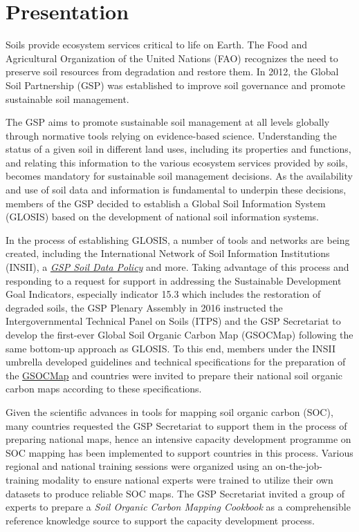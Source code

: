 \documentclass[10pt,b5paper,]{book}
\theoremstyle{definition}
\theoremstyle{definition}
\theoremstyle{definition}
\theoremstyle{remark}
\begin{document}
\mainmatter
\tableofcontents
\listoffigures
\listoftables

\hypertarget{presentation}{%
\chapter{Presentation}\label{presentation}}

Soils provide ecosystem services critical to life on Earth. The Food and
Agricultural Organization of the United Nations (FAO) recognizes the
need to preserve soil resources from degradation and restore them. In
2012, the Global Soil Partnership (GSP) was established to improve soil
governance and promote sustainable soil management.

The GSP aims to promote sustainable soil management at all levels
globally through normative tools relying on evidence-based science.
Understanding the status of a given soil in different land uses,
including its properties and functions, and relating this information to
the various ecosystem services provided by soils, becomes mandatory for
sustainable soil management decisions. As the availability and use of
soil data and information is fundamental to underpin these decisions,
members of the GSP decided to establish a Global Soil Information System
(GLOSIS) based on the development of national soil information systems.

In the process of establishing GLOSIS, a number of tools and networks
are being created, including the International Network of Soil
Information Institutions (INSII), a
\href{http://www.fao.org/3/a-bs975e.pdf}{\emph{GSP Soil Data Policy}}
and more. Taking advantage of this process and responding to a request
for support in addressing the Sustainable Development Goal Indicators,
especially indicator 15.3 which includes the restoration of degraded
soils, the GSP Plenary Assembly in 2016 instructed the Intergovernmental
Technical Panel on Soils (ITPS) and the GSP Secretariat to develop the
first-ever Global Soil Organic Carbon Map (GSOCMap) following the same
bottom-up approach as GLOSIS. To this end, members under the INSII
umbrella developed guidelines and technical specifications for the
preparation of the \href{http://www.fao.org/3/a-bp164e.pdf}{GSOCMap} and
countries were invited to prepare their national soil organic carbon
maps according to these specifications.

Given the scientific advances in tools for mapping soil organic carbon
(SOC), many countries requested the GSP Secretariat to support them in
the process of preparing national maps, hence an intensive capacity
development programme on SOC mapping has been implemented to support
countries in this process. Various regional and national training
sessions were organized using an on-the-job-training modality to ensure
national experts were trained to utilize their own datasets to produce
reliable SOC maps. The GSP Secretariat invited a group of experts to
prepare a \emph{Soil Organic Carbon Mapping Cookbook} as a
comprehensible reference knowledge source to support the capacity
development process.
\end{document}
